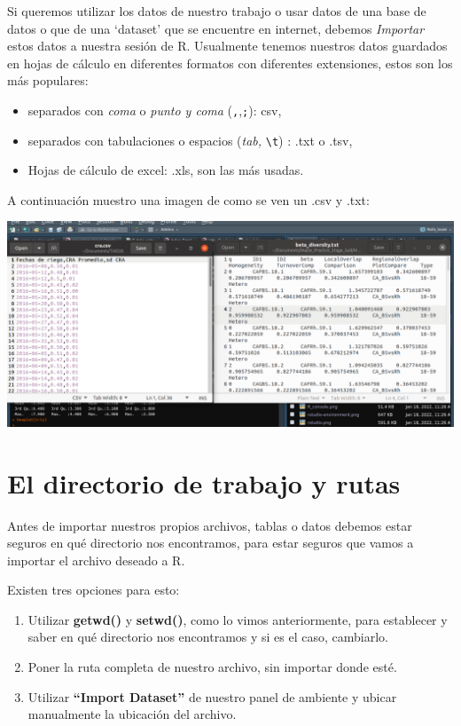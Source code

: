 \documentclass[
]{book}
\begin{document}
Si queremos utilizar los datos de nuestro trabajo o usar datos de una base de datos o que de una `dataset' que se encuentre en internet, debemos \emph{Importar} estos datos a nuestra sesión de R.
Usualmente tenemos nuestros datos guardados en hojas de cálculo en diferentes formatos con diferentes extensiones, estos son los más populares:

\begin{itemize}
\item
  separados con \emph{coma} o \emph{punto y coma} (\texttt{,},\texttt{;}): csv,
\item
  separados con tabulaciones o espacios (\emph{tab,} \texttt{\textbackslash{}t}) : .txt o .tsv,
\item
  Hojas de cálculo de excel: .xls, son las más usadas.
\end{itemize}

A continuación muestro una imagen de como se ven un .csv y .txt:

\begin{center}\includegraphics[width=400pt]{images//files} \end{center}

\section{El directorio de trabajo y rutas}\label{el-directorio-de-trabajo-y-rutas}

Antes de importar nuestros propios archivos, tablas o datos debemos estar seguros en qué directorio nos encontramos, para estar seguros que vamos a importar el archivo deseado a R.

Existen tres opciones para esto:

\begin{enumerate}
\def\labelenumi{\arabic{enumi}.}
\item
  Utilizar \textbf{getwd()} y \textbf{setwd()}, como lo vimos anteriormente, para establecer y saber en qué directorio nos encontramos y si es el caso, cambiarlo.
\item
  Poner la ruta completa de nuestro archivo, sin importar donde esté.
\item
  Utilizar \textbf{``Import Dataset''} de nuestro panel de ambiente y ubicar manualmente la ubicación del archivo.
\end{enumerate}
\end{document}
